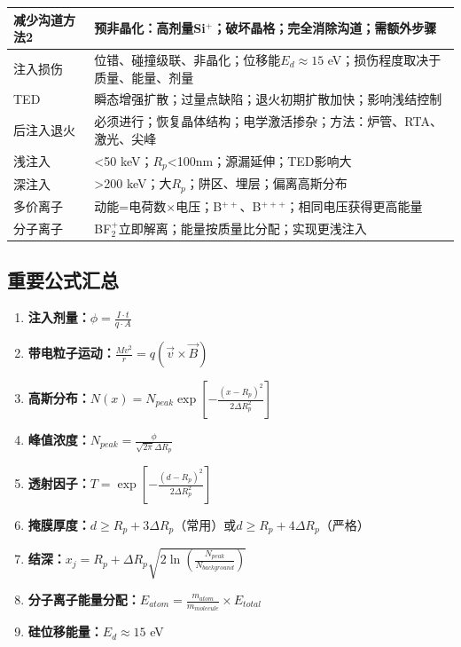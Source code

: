 \documentclass[UTF8,12pt,a4paper]{ctexart}
\begin{document}
\begin{longtable}{|L{4cm}|L{11cm}|}
减少沟道方法2 & 预非晶化：高剂量Si$^+$；破坏晶格；完全消除沟道；需额外步骤 \\
\hline

注入损伤 & 位错、碰撞级联、非晶化；位移能$E_d \approx 15$ eV；损伤程度取决于质量、能量、剂量 \\
\hline

TED & 瞬态增强扩散；过量点缺陷；退火初期扩散加快；影响浅结控制 \\
\hline

后注入退火 & 必须进行；恢复晶体结构；电学激活掺杂；方法：炉管、RTA、激光、尖峰 \\
\hline

浅注入 & <50 keV；$R_p$<100nm；源漏延伸；TED影响大 \\
\hline

深注入 & >200 keV；大$R_p$；阱区、埋层；偏离高斯分布 \\
\hline

多价离子 & 动能=电荷数×电压；B$^{++}$、B$^{+++}$；相同电压获得更高能量 \\
\hline

分子离子 & BF$_2^+$立即解离；能量按质量比分配；实现更浅注入 \\
\hline

\end{longtable}

\subsection{重要公式汇总}

\begin{enumerate}
    \item \textbf{注入剂量：}$\phi = \frac{I \cdot t}{q \cdot A}$
    
    \item \textbf{带电粒子运动：}$\frac{Mv^2}{r} = q(\vec{v} \times \vec{B})$
    
    \item \textbf{高斯分布：}$N(x) = N_{peak}\exp\left[-\frac{(x-R_p)^2}{2\Delta R_p^2}\right]$
    
    \item \textbf{峰值浓度：}$N_{peak} = \frac{\phi}{\sqrt{2\pi}\Delta R_p}$
    
    \item \textbf{透射因子：}$T = \exp\left[-\frac{(d-R_p)^2}{2\Delta R_p^2}\right]$
    
    \item \textbf{掩膜厚度：}$d \geq R_p + 3\Delta R_p$（常用）或$d \geq R_p + 4\Delta R_p$（严格）
    
    \item \textbf{结深：}$x_j = R_p + \Delta R_p\sqrt{2\ln\left(\frac{N_{peak}}{N_{background}}\right)}$
    
    \item \textbf{分子离子能量分配：}$E_{atom} = \frac{m_{atom}}{m_{molecule}} \times E_{total}$
    
    \item \textbf{硅位移能量：}$E_d \approx 15$ eV
\end{enumerate}
\end{document}
